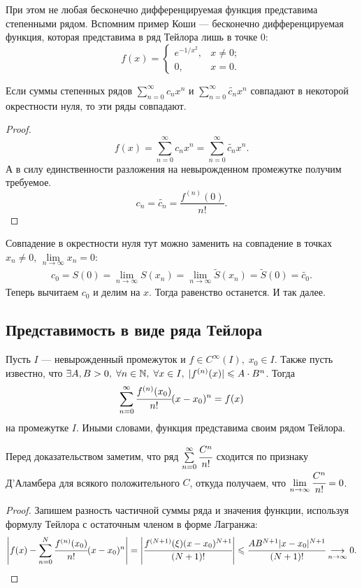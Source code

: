 \documentclass[a4paper, 12pt]{article}
\begin{document}
При этом не любая бесконечно дифференцируемая функция представима степенными рядом. Вспомним пример Коши --- бесконечно дифференцируемая функция, которая представима в ряд Тейлора лишь в точке 0:
\[
    f(x) = 
    \begin{cases}
        e^{-1/x^2}, & x \neq 0;\\
        0, & x = 0.
    \end{cases}
\]
\begin{Consequence}
    Если суммы степенных рядов $\sum\limits_{n=0}^{\infty}c_n x^n$ и $\sum\limits_{n=0}^{\infty}\widetilde{c_n} x^n$ совпадают в некоторой окрестности нуля, то эти ряды совпадают.
\end{Consequence}
\begin{proof}
    \[
        f(x) = \sum\limits_{n=0}^{\infty} c_n x^n = \sum\limits_{n=0}^{\infty} \widetilde{c_n} x^n.
    \]
    А в силу единственности разложения на невырожденном промежутке получим требуемое.
    $$
    c_n = \widetilde{c_n} = \dfrac{f^{(n)}(0)}{n!}.
    $$
\end{proof}
\begin{Comment}
    Совпадение в окрестности нуля тут можно заменить на совпадение в точках $x_n \neq 0$, $\lim\limits_{n\to \infty} x_n = 0$:
    \begin{gather*}
        c_0 = S(0) = \lim\limits_{n \to \infty} S(x_n) = \lim\limits_{n \to \infty} \widetilde{S}(x_n) = \widetilde{S}(0) = \widetilde{c_0}.
    \end{gather*}
    Теперь вычитаем $c_0$ и делим на $x$. Тогда равенство останется. И так далее.
\end{Comment}

\subsection{Представимость в виде ряда Тейлора}

\begin{Theorem}
    Пусть $I$ --- невырожденный промежуток и $f \in C^{\infty}(I),\; x_0 \in I$. Также пусть известно, что $\exists A, B>0,\; \forall n\in \mathbb{N},\; \forall x\in I,\; |f^{(n)}(x)| \leqslant A\cdot B^n$. Тогда 
    \[
        \sum\limits_{n = 0}^{\infty} \cfrac{f^{(n)}(x_0)}{n!}(x-x_0)^n = f(x)
    \]
    на промежутке $I$.    Иными словами, функция представима своим рядом Тейлора.
\end{Theorem}
Перед доказательством заметим, что ряд $\sum\limits_{n=0}^{\infty}\cfrac{C^n}{n!}$ сходится по признаку Д'Аламбера для всякого положительного $C$, откуда получаем, что $\lim\limits_{n \to \infty}\cfrac{C^n}{n!} = 0$.
\begin{proof}
    Запишем разность частичной суммы ряда и значения функции, используя формулу Тейлора с остаточным членом в форме Лагранжа:
    \begin{gather*}
        \left| f(x) - \sum\limits_{n=0}^{N} \cfrac{f^{(n)}(x_0)}{n!} (x-x_0)^n\right| = 
        \left| \cfrac{f^{(N+1)}(\xi) (x-x_0)^{N+1}}{(N+1)!} \right| \leqslant \cfrac{AB^{N+1}|x-x_0|^{N+1}}{(N+1)!} \underset{n \to \infty}{\longrightarrow} 0.
    \end{gather*}
\end{proof}
\end{document}
